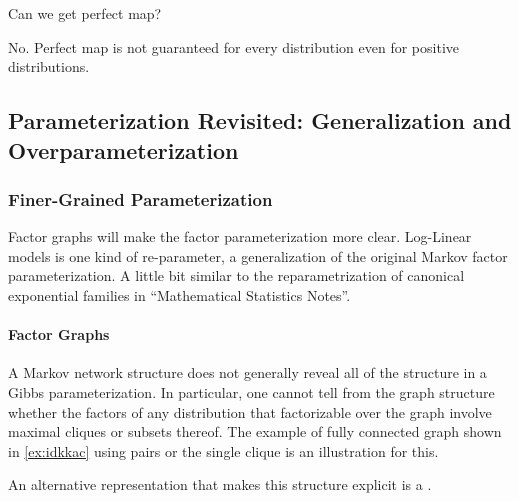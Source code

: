 \documentclass{article}
\begin{document}
 Can we get perfect map?

 No. Perfect map is not guaranteed for every distribution even for positive distributions.

\subsection{Parameterization Revisited: Generalization and Overparameterization}
\subsubsection{Finer-Grained Parameterization}
Factor graphs will make the factor parameterization more clear. Log-Linear models is one kind of re-parameter, a generalization of the original Markov factor parameterization. A little bit similar to the reparametrization of canonical exponential families in ``Mathematical Statistics Notes''.
\paragraph{Factor Graphs}

A Markov network structure does not generally reveal all of the structure in a Gibbs parameterization. In particular, one cannot tell from the graph structure whether the factors of any distribution that factorizable over the graph involve maximal cliques or subsets thereof. The example of fully connected graph shown in \cref{ex:idkkac} using pairs or the single clique is an illustration for this.

An alternative representation that makes this structure explicit is a . 
\end{document}
